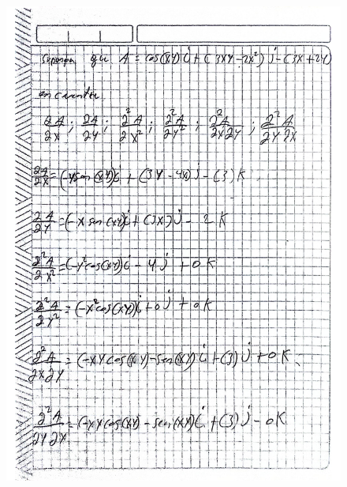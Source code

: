 \documentclass{article}
\begin{document}
\begin{figure}[h!]
\begin{minipage}{0.45\textwidth}
        \includegraphics[width=\textwidth]{imgs/Actividad 5 julio amaya.pdf}
    \end{minipage}
    
    \vspace{0.5cm}
    

\end{figure}
\end{document}

